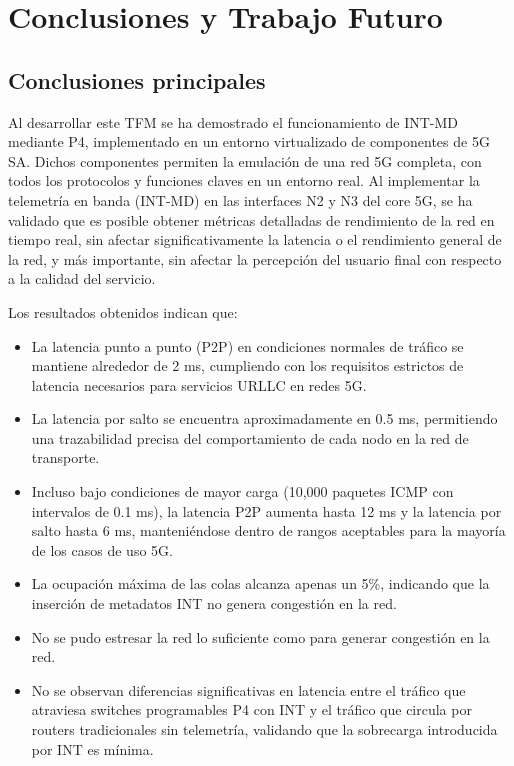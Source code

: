 \chapter{Conclusiones y Trabajo Futuro}
\section{Conclusiones principales}

Al desarrollar este TFM se ha demostrado el funcionamiento de INT-MD mediante P4, implementado en un entorno virtualizado de componentes de 5G SA. Dichos componentes permiten la emulación de una red 5G completa, con todos los protocolos y funciones claves en un entorno real.
Al implementar la telemetría en banda (INT-MD) en las interfaces N2 y N3 del core 5G, se ha validado que es posible obtener métricas detalladas de rendimiento de la red en tiempo real, sin afectar significativamente la latencia o el rendimiento general de la red, y más importante, sin afectar la percepción del usuario final con respecto a la calidad del servicio.

Los resultados obtenidos indican que:
\begin{itemize}
    \item La latencia punto a punto (P2P) en condiciones normales de tráfico se mantiene alrededor de 2 ms, cumpliendo con los requisitos estrictos de latencia necesarios para servicios URLLC en redes 5G.
    \item La latencia por salto se encuentra aproximadamente en 0.5 ms, permitiendo una trazabilidad precisa del comportamiento de cada nodo en la red de transporte.
    \item Incluso bajo condiciones de mayor carga (10,000 paquetes ICMP con intervalos de 0.1 ms), la latencia P2P aumenta hasta 12 ms y la latencia por salto hasta 6 ms, manteniéndose dentro de rangos aceptables para la mayoría de los casos de uso 5G.
    \item La ocupación máxima de las colas alcanza apenas un 5\%, indicando que la inserción de metadatos INT no genera congestión en la red.
    \item No se pudo estresar la red lo suficiente como para generar congestión en la red.
    \item No se observan diferencias significativas en latencia entre el tráfico que atraviesa switches programables P4 con INT y el tráfico que circula por routers tradicionales sin telemetría, validando que la sobrecarga introducida por INT es mínima.
\end{itemize}


